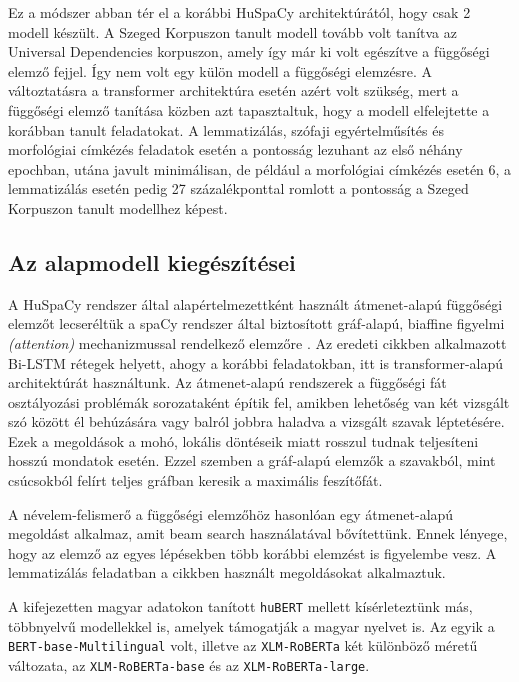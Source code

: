 \documentclass{llncs}
\newcommand{\hubert}{\texttt{huBERT}}
\newcommand{\roberta}{\texttt{XLM-RoBERTa}}
\newcommand{\robertaB}{\texttt{XLM-RoBERTa-base}}
\newcommand{\robertaL}{\texttt{XLM-RoBERTa-large}}
\newcommand{\bertmulti}{\texttt{BERT-base-Multilingual}}
\newcommand{\spacy}{spaCy}
\newcommand{\huspacy}{HuSpaCy}
\newcommand{\trf}{transformer}
\begin{document}
Ez a módszer abban tér el a korábbi \huspacy{} architektúrától, hogy csak 2 modell készült. A Szeged Korpuszon tanult modell tovább volt tanítva az Universal Dependencies korpuszon, amely így már ki volt egészítve a függőségi elemző fejjel. Így nem volt egy külön modell a függőségi elemzésre.
A változtatásra a \trf{} architektúra esetén azért volt szükség, mert a függőségi elemző tanítása közben azt tapasztaltuk, hogy a modell elfelejtette a korábban tanult feladatokat. A lemmatizálás, szófaji egyértelműsítés és morfológiai címkézés feladatok esetén a pontosság lezuhant az első néhány epochban, utána javult minimálisan, de például a morfológiai címkézés esetén 6, a lemmatizálás esetén pedig 27 százalékponttal romlott a pontosság a Szeged Korpuszon tanult modellhez képest.


\subsection{Az alapmodell kiegészítései}
\label{biaffine}

A \huspacy{} rendszer által alapértelmezettként használt átmenet-alapú függőségi elemzőt lecseréltük a \spacy{} rendszer által biztosított gráf-alapú, biaffine figyelmi \emph{(attention)} mechanizmussal rendelkező elemzőre \citep{biaffine}. Az eredeti cikkben alkalmazott Bi-LSTM rétegek helyett, ahogy a korábbi feladatokban, itt is \trf{}-alapú architektúrát használtunk.
Az átmenet-alapú rendszerek a függőségi fát osztályozási problémák sorozataként építik fel, amikben lehetőség van két vizsgált szó között él behúzására vagy balról jobbra haladva a vizsgált szavak léptetésére. Ezek a megoldások a mohó, lokális döntéseik miatt rosszul tudnak teljesíteni hosszú mondatok esetén. Ezzel szemben a gráf-alapú elemzők a szavakból, mint csúcsokból felírt teljes gráfban keresik a maximális feszítőfát. 

A névelem-felismerő a függőségi elemzőhöz hasonlóan egy átmenet-alapú megoldást alkalmaz, amit beam search használatával bővítettünk. Ennek lényege, hogy az elemző az egyes lépésekben több korábbi elemzést is figyelembe vesz. A lemmatizálás feladatban a \cite{peti} cikkben használt megoldásokat alkalmaztuk.

A kifejezetten magyar adatokon tanított \hubert{} mellett kísérleteztünk más, többnyelvű modellekkel is, amelyek támogatják a magyar nyelvet is. Az egyik a \bertmulti{} volt, illetve az \roberta{} két különböző méretű változata, az \robertaB{} és az \robertaL{}.
\end{document}
